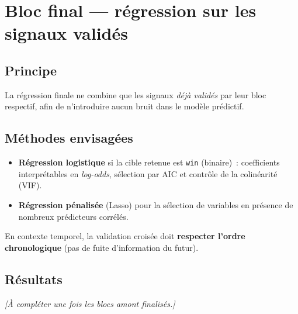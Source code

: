 \chapter{Bloc final --- régression sur les signaux validés}
\label{chap:blocfinal}


\section{Principe}
La régression finale ne combine que les signaux \emph{déjà validés} par
leur bloc respectif, afin de n'introduire aucun bruit dans le modèle
prédictif.

\section{Méthodes envisagées}
\begin{itemize}
  \item \textbf{Régression logistique} si la cible retenue est
        \texttt{win} (binaire)~: coefficients interprétables en
        \emph{log-odds}, sélection par AIC et contrôle de la colinéarité
        (VIF).
  \item \textbf{Régression pénalisée} (Lasso) pour la sélection de
        variables en présence de nombreux prédicteurs corrélés.
\end{itemize}

\begin{conditions}
En contexte temporel, la validation croisée doit \textbf{respecter
l'ordre chronologique} (pas de fuite d'information du futur).
\end{conditions}

\section{Résultats}
\emph{[À compléter une fois les blocs amont finalisés.]}
